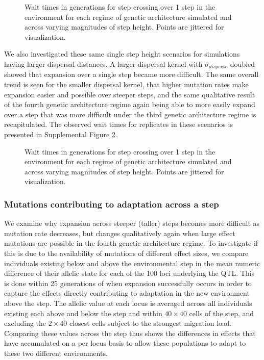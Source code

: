 \begin{figure}[h]
\centering
{}
\caption[Wait times for step crossing.]{Wait times in generations for step crossing over 1 step in the environment for each regime of genetic architecture simulated and across varying magnitudes of step height. Points are jittered for visualization.}
\label{fig:waittimes}
\end{figure}

We also investigated these same single step height scenarios for simulations having larger dispersal distances. A larger dispersal kernel with $\sigma_{disperse}$ doubled showed that expansion over a single step became more difficult. The same overall trend is seen for the smaller dispersal kernel, that higher mutation rates make expansion easier and possible over steeper steps, and the same qualitative result of the fourth genetic architecture regime again being able to more easily expand over a step that was more difficult under the third genetic architecture regime is recapitulated. The observed wait times for replicates in these scenarios is presented in Supplemental Figure \ref{fig:waittimes200}.

\begin{figure}[h]
\centering
{}
\caption[Wait times for step crossing.]{Wait times in generations for step crossing over 1 step in the environment for each regime of genetic architecture simulated and across varying magnitudes of step height. Points are jittered for visualization.}
\label{fig:waittimes200}
\end{figure}

\subsubsection{Mutations contributing to adaptation across a step}

We examine why expansion across steeper (taller) steps becomes more difficult as mutation rate decreases, but changes qualitatively again when large effect mutations are possible in the fourth genetic architecture regime. To investigate if this is due to the availability of mutations of different effect sizes, we compare individuals existing below and above the environmental step in the mean numeric difference of their allelic state for each of the 100 loci underlying the QTL. This is done within 25 generations of when expansion successfully occurs in order to capture the effects directly contributing to adaptation in the new environment above the step. The allelic value at each locus is averaged across all individuals existing each above and below the step and within $40\times40$ cells of the step, and excluding the $2\times40$ closest cells subject to the strongest migration load. Comparing these values across the step thus shows the differences in effects that have accumulated on a per locus basis to allow these populations to adapt to these two different environments.

